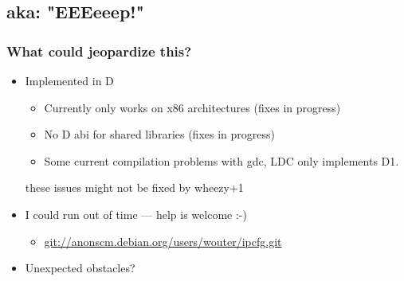 \documentclass[ignorenonframetext]{beamer}
\begin{document}
\subsection{aka: "EEEeeep!"}
\begin{frame}
  \frametitle{What could jeopardize this?}
  \begin{itemize}
    \item Implemented in D
    \begin{itemize}
      \item Currently only works on x86 architectures (fixes in progress)
      \item No D abi for shared libraries (fixes in progress)
      \item Some current compilation problems with gdc, LDC only implements D1.
    \end{itemize}

    these issues might not be fixed by wheezy+1

    \item I could run out of time --- help is welcome :-)
    \begin{itemize}
      \item \url{git://anonscm.debian.org/users/wouter/ipcfg.git}
    \end{itemize}
    \item Unexpected obstacles?
  \end{itemize}
\end{frame}
\end{document}

